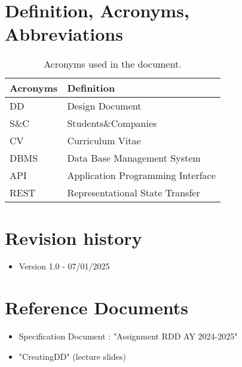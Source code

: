 \section{Definition, Acronyms, Abbreviations}
\label{sec:definition_acronyms_abbreviations}%
\begin{table}[H]
    \begin{center}
        \begin{tabular}{ |l|l| }
            \hline
            \textbf{Acronyms} & \textbf{Definition}                              \\
            \hline
            DD & Design Document \\ \hline
            S\&C & Students\&Companies \\ \hline
            CV & Curriculum Vitae \\ \hline
            DBMS & Data Base Management System \\ \hline
            API & Application Programming Interface\\ \hline
            REST & Representational State Transfer \\ \hline
        \end{tabular}
        \caption{Acronyms used in the document.}
        \label{tab:acronyms}%
    \end{center}
\end{table}

\section{Revision history}
\label{sec:revision_history}%
 \begin{itemize}
     \item Version 1.0 - 07/01/2025
 \end{itemize}

\section{Reference Documents}
\label{sec:reference_documents}%
\begin{itemize}
    \item Specification Document : "Assignment RDD AY 2024-2025"
    \item "CreatingDD" (lecture slides)
\end{itemize}


